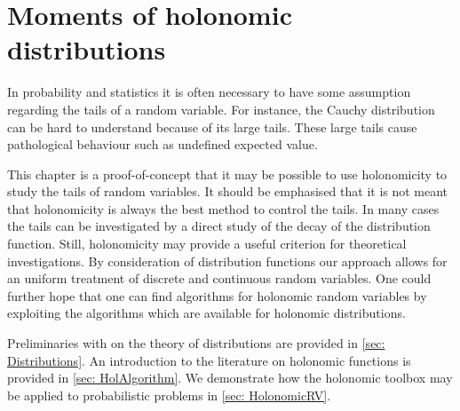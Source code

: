 \chapter{Moments of holonomic distributions}
In probability and statistics it is often necessary to have some assumption regarding the tails of a random variable.
For instance, the Cauchy distribution can be hard to understand because of its large tails.
These large tails cause pathological behaviour such as undefined expected value.

This chapter is a proof-of-concept that it may be possible to use holonomicity to study the tails of random variables.
It should be emphasised that it is not meant that holonomicity is always the best method to control the tails.
In many cases the tails can be investigated by a direct study of the decay of the distribution function.
Still, holonomicity may provide a useful criterion for theoretical investigations.
By consideration of distribution functions our approach allows for an uniform treatment of discrete and continuous random variables.
One could further hope that one can find algorithms for holonomic random variables by exploiting the algorithms which are available for holonomic distributions.

Preliminaries with on the theory of distributions are provided in \cref{sec: Distributions}.
An introduction to the literature on holonomic functions is provided in \cref{sec: HolAlgorithm}.
We demonstrate how the holonomic toolbox may be applied to probabilistic problems in \cref{sec: HolonomicRV}.
